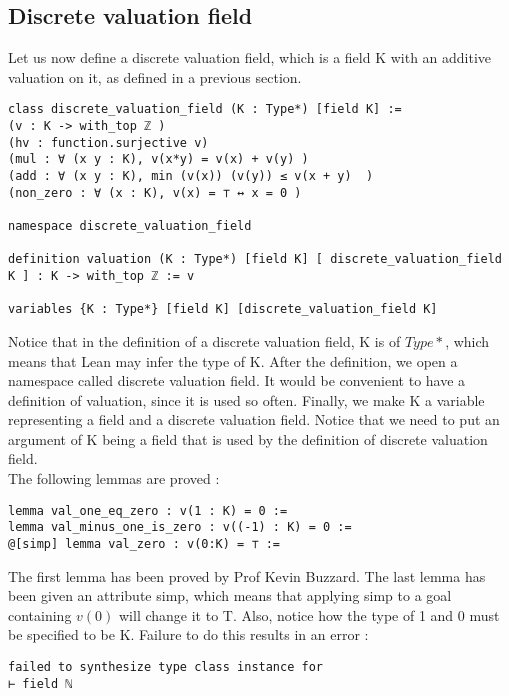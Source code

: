 \documentclass[10pt, a4paper]{article}
\begin{document}
\subsection{Discrete valuation field}

Let us now define a discrete valuation field, which is a field K with an additive valuation on it, as defined in a previous section. 

\begin{lstlisting}
class discrete_valuation_field (K : Type*) [field K] :=
(v : K -> with_top ℤ ) 
(hv : function.surjective v)
(mul : ∀ (x y : K), v(x*y) = v(x) + v(y) )
(add : ∀ (x y : K), min (v(x)) (v(y)) ≤ v(x + y)  )
(non_zero : ∀ (x : K), v(x) = ⊤ ↔ x = 0 )

namespace discrete_valuation_field

definition valuation (K : Type*) [field K] [ discrete_valuation_field K ] : K -> with_top ℤ := v

variables {K : Type*} [field K] [discrete_valuation_field K]
\end{lstlisting}

Notice that in the definition of a discrete valuation field, K is of $Type*$, which means that Lean may infer the type of K. After the definition, we open a namespace called discrete valuation field. It would be convenient to have a definition of valuation, since it is used so often. Finally, we make K a variable representing a field and a discrete valuation field. Notice that we need to put an argument of K being a field that is used by the definition of discrete valuation field. \\ 

The following lemmas are proved : 

\begin{lstlisting}
lemma val_one_eq_zero : v(1 : K) = 0 :=
lemma val_minus_one_is_zero : v((-1) : K) = 0 :=
@[simp] lemma val_zero : v(0:K) = ⊤ :=
\end{lstlisting}

The first lemma has been proved by Prof Kevin Buzzard. The last lemma has been given an attribute simp, which means that applying simp to a goal containing $v(0)$ will change it to T. Also, notice how the type of 1 and 0 must be specified to be K. Failure to do this results in an error : 

\begin{lstlisting}
failed to synthesize type class instance for
⊢ field ℕ
\end{lstlisting}
\end{document}
